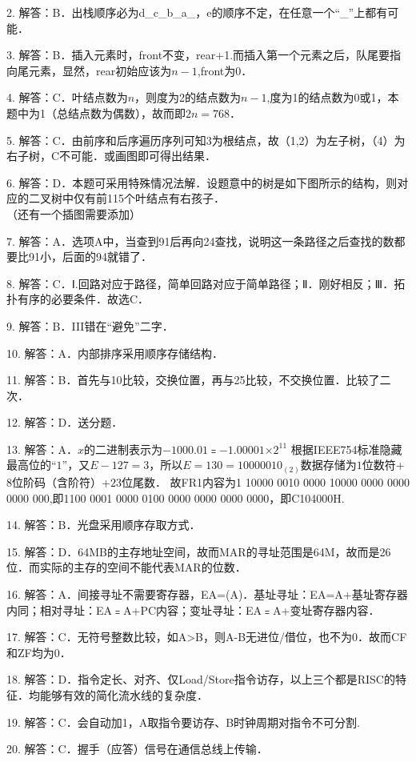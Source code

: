 2. 解答：B．出栈顺序必为d_c_b_a_，e的顺序不定，在任意一个“_”上都有可能．

3. 解答：B．插入元素时，front不变，rear+1.而插入第一个元素之后，队尾要指向尾元素，显然，rear初始应该为$n-1$,front为$0$．

4. 解答：C．叶结点数为$n$，则度为2的结点数为$n-1$,度为1的结点数为0或1，本题中为1（总结点数为偶数），故而即$2n=768$．

5. 解答：C．由前序和后序遍历序列可知3为根结点，故（1,2）为左子树，（4）为右子树，C不可能．或画图即可得出结果．

6. 解答：D．本题可采用特殊情况法解．设题意中的树是如下图所示的结构，则对应的二叉树中仅有前115个叶结点有右孩子．\\
（还有一个插图需要添加）

7. 解答：A．选项A中，当查到91后再向24查找，说明这一条路径之后查找的数都要比91小，后面的94就错了．

8. 解答：C．Ⅰ.回路对应于路径，简单回路对应于简单路径；Ⅱ．刚好相反；Ⅲ．拓扑有序的必要条件．故选C．

9. 解答：B．III错在“避免”二字．

10. 解答：A．内部排序采用顺序存储结构．

11. 解答：B．首先与10比较，交换位置，再与25比较，不交换位置．比较了二次．

12. 解答：D．送分题．

13. 解答：A．$x$的二进制表示为$-1000.01$﹦$-1.000 01$×$2^{11}$ 根据IEEE754标准隐藏最高位的“$1$”，又$E-127=3$，所以$E=130=1000 0010_{(2)}$数据存储为$1$位数符+$8$位阶码（含阶符）+$23$位尾数．
故FR1内容为1 10000 0010 0000 10000 0000 0000 0000 000,即1100 0001 0000 0100 0000 0000 0000 0000，即C104000H.

14. 解答：B．光盘采用顺序存取方式．

15. 解答：D．64MB的主存地址空间，故而MAR的寻址范围是64M，故而是26位．而实际的主存的空间不能代表MAR的位数．

16. 解答：A．间接寻址不需要寄存器，EA=(A)．基址寻址：EA=A+基址寄存器内同；相对寻址：EA﹦A+PC内容；变址寻址：EA﹦A+变址寄存器内容．

17. 解答：C．无符号整数比较，如A>B，则A-B无进位/借位，也不为0．故而CF和ZF均为0．

18. 解答：D．指令定长、对齐、仅Load/Store指令访存，以上三个都是RISC的特征．均能够有效的简化流水线的复杂度．

19. 解答：C．会自动加1，A取指令要访存、B时钟周期对指令不可分割.

20. 解答：C．握手（应答）信号在通信总线上传输．

